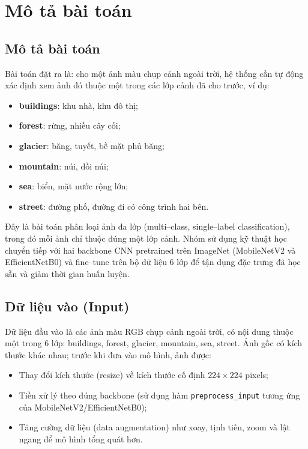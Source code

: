 \documentclass[12pt,a4paper]{article}
\begin{document}
\section{Mô tả bài toán}\label{sec:bai-toan}

\subsection{Mô tả bài toán}
Bài toán đặt ra là: cho một ảnh màu chụp cảnh ngoài trời, hệ thống cần tự động xác định xem ảnh đó thuộc một trong các lớp cảnh đã cho trước, ví dụ:
\begin{itemize}
    \item \textbf{buildings}: khu nhà, khu đô thị;
    \item \textbf{forest}: rừng, nhiều cây cối;
    \item \textbf{glacier}: băng, tuyết, bề mặt phủ băng;
    \item \textbf{mountain}: núi, đồi núi;
    \item \textbf{sea}: biển, mặt nước rộng lớn;
    \item \textbf{street}: đường phố, đường đi có công trình hai bên.
\end{itemize}

Đây là bài toán phân loại ảnh đa lớp (multi--class, single--label classification), trong đó mỗi ảnh chỉ thuộc đúng một lớp cảnh. Nhóm sử dụng kỹ thuật học chuyển tiếp với hai backbone CNN pretrained trên ImageNet (MobileNetV2 và EfficientNetB0) và fine--tune trên bộ dữ liệu 6 lớp để tận dụng đặc trưng đã học sẵn và giảm thời gian huấn luyện.

\subsection{Dữ liệu vào (Input)}
Dữ liệu đầu vào là các ảnh màu RGB chụp cảnh ngoài trời, có nội dung thuộc một trong 6 lớp: buildings, forest, glacier, mountain, sea, street. Ảnh gốc có kích thước khác nhau; trước khi đưa vào mô hình, ảnh được:
\begin{itemize}
    \item Thay đổi kích thước (resize) về kích thước cố định $224\times 224$ pixels;
    \item Tiền xử lý theo đúng backbone (sử dụng hàm \texttt{preprocess\_input} tương ứng của MobileNetV2/EfficientNetB0);
    \item Tăng cường dữ liệu (data augmentation) như xoay, tịnh tiến, zoom và lật ngang để mô hình tổng quát hơn.
\end{itemize}
\end{document}
